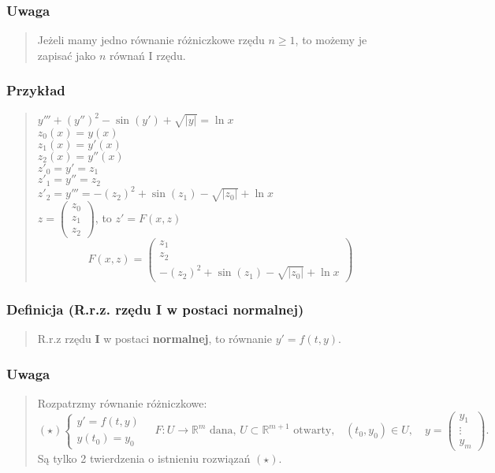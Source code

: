 \documentclass[10pt,a4paper]{article}
\begin{document}
{\subsubsection*{Uwaga}
\begin{quote}
Jeżeli mamy jedno równanie różniczkowe rzędu $n \ge 1$, to możemy je zapisać jako $n$ równań I rzędu.
\end{quote}

\subsubsection*{Przykład}
\begin{quote}
$y''' + (y'')^2 - \sin(y') + \sqrt{|y|} = \ln x$\\
$z_0(x) = y(x)$\\
$z_1(x) = y'(x)$\\
$z_2(x) = y''(x)$\\
$z'_0 = y' = z_1$\\
$z'_1 = y'' = z_2$\\
$z'_2 = y''' = -(z_2)^2 + \sin(z_1) - \sqrt{|z_0|} + \ln x$\\
$z = \begin{pmatrix} z_0 \\ z_1 \\ z_2 \end{pmatrix}$, to $z'=F(x,z)$\\
$$F(x,z) = \begin{pmatrix} z_1 \\ z_2 \\ -(z_2)^2 + \sin(z_1) - \sqrt{|z_0|} + \ln x \end{pmatrix}$$
\end{quote}

\subsubsection*{Definicja (R.r.z. rzędu I w postaci normalnej)}
\begin{quote}
R.r.z rzędu \textbf{I} w postaci \textbf{normalnej}, to równanie $y'=f(t,y)$.
\end{quote}

\subsubsection*{Uwaga}
\begin{quote}
Rozpatrzmy równanie różniczkowe:\\
$$(\star) \begin{cases} y'=f(t,y) \\ y(t_0)=y_0 \end{cases} \quad F: U \to \mathbb{R}^m \text{ dana, } U \subset \mathbb{R}^{m+1} \text{ otwarty,} \quad
(t_0, y_0) \in U, \quad y=\begin{pmatrix} y_1 \\ \vdots \\ y_m \end{pmatrix}.$$
Są tylko 2 twierdzenia o istnieniu rozwiązań $(\star)$.
\end{quote}

}
\end{document}
